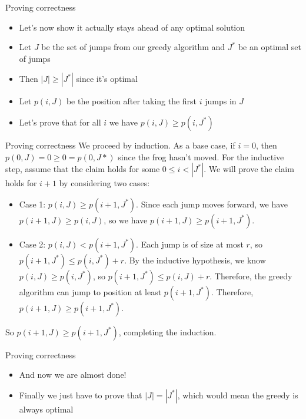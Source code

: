 \documentclass{beamer}
\begin{document}
\begin{frame}[plain]{Proving correctness}
    \begin{itemize}
        \item Let's now show it actually stays ahead of any optimal solution
        \item Let $J$ be the set of jumps from our greedy algorithm and $J^*$ be an optimal set of jumps
        \item Then $|J| \geq |J^*|$ since it's optimal
        \item Let $p(i, J)$ be the position after taking the first $i$ jumps in $J$
        \item Let's prove that for all $i$ we have $p(i, J) \geq p(i, J^*)$
    \end{itemize}
\end{frame}

\begin{frame}[plain]{Proving correctness}
We proceed by induction. 
As a base case, if $i = 0$, then
$p(0, J) = 0 \geq 0 = p(0, J*)$ since the frog hasn't moved.
For the inductive step, assume that the claim holds
for some $0 \leq i < | J^*|$. We will prove the claim holds
for $i + 1$ by considering two cases:
\begin{itemize}
\item Case 1: $p(i, J) \geq p(i + 1, J^*)$. Since each jump moves forward, 
we have $p(i + 1, J) \geq p(i, J)$, so we have $p(i + 1, J) \geq p(i + 1, J^*)$.
\item Case 2: $p(i, J) < p(i + 1, J^*)$. Each jump is of size at most $r$, 
so $p(i + 1, J^*) \leq p(i, J^*) + r$. By the inductive hypothesis, we
know $p(i, J) \geq p(i, J^*)$, so $p(i + 1, J^*) \leq p(i, J) + r$. Therefore, 
the greedy algorithm can jump to position at least $p(i + 1, J^*)$. Therefore,
$p(i + 1, J) \geq p(i + 1, J^*)$.
\end{itemize}
So $p(i + 1, J) \geq p(i + 1, J^*)$, completing the induction.
\end{frame}

\begin{frame}[plain]{Proving correctness}
    \begin{itemize}
        \item And now we are almost done!
        \item Finally we just have to prove that $|J| = |J^*|$, which would mean the greedy is always optimal
    \end{itemize}
\end{frame}
\end{document}
